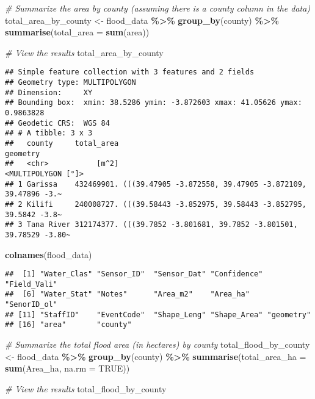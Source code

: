 \documentclass[
]{article}
\newenvironment{Shaded}{\begin{snugshade}}{\end{snugshade}}
\newcommand{\AttributeTok}[1]{\textcolor[rgb]{0.13,0.29,0.53}{#1}}
\newcommand{\CommentTok}[1]{\textcolor[rgb]{0.56,0.35,0.01}{\textit{#1}}}
\newcommand{\ConstantTok}[1]{\textcolor[rgb]{0.56,0.35,0.01}{#1}}
\newcommand{\FunctionTok}[1]{\textcolor[rgb]{0.13,0.29,0.53}{\textbf{#1}}}
\newcommand{\NormalTok}[1]{#1}
\newcommand{\OtherTok}[1]{\textcolor[rgb]{0.56,0.35,0.01}{#1}}
\newcommand{\SpecialCharTok}[1]{\textcolor[rgb]{0.81,0.36,0.00}{\textbf{#1}}}
\begin{document}
\begin{Shaded}
\begin{Highlighting}[]
\CommentTok{\# Summarize the area by county (assuming there is a county column in the data)}
\NormalTok{total\_area\_by\_county }\OtherTok{\textless{}{-}}\NormalTok{ flood\_data }\SpecialCharTok{\%\textgreater{}\%}
  \FunctionTok{group\_by}\NormalTok{(county) }\SpecialCharTok{\%\textgreater{}\%}
  \FunctionTok{summarise}\NormalTok{(}\AttributeTok{total\_area =} \FunctionTok{sum}\NormalTok{(area))}

\CommentTok{\# View the results}
\NormalTok{total\_area\_by\_county}
\end{Highlighting}
\end{Shaded}

\begin{verbatim}
## Simple feature collection with 3 features and 2 fields
## Geometry type: MULTIPOLYGON
## Dimension:     XY
## Bounding box:  xmin: 38.5286 ymin: -3.872603 xmax: 41.05626 ymax: 0.9863828
## Geodetic CRS:  WGS 84
## # A tibble: 3 x 3
##   county     total_area                                                 geometry
##   <chr>           [m^2]                                       <MULTIPOLYGON [°]>
## 1 Garissa    432469901. (((39.47905 -3.872558, 39.47905 -3.872109, 39.47896 -3.~
## 2 Kilifi     240008727. (((39.58443 -3.852975, 39.58443 -3.852795, 39.5842 -3.8~
## 3 Tana River 312174377. (((39.7852 -3.801681, 39.7852 -3.801501, 39.78529 -3.80~
\end{verbatim}

\begin{Shaded}
\begin{Highlighting}[]
\FunctionTok{colnames}\NormalTok{(flood\_data)}
\end{Highlighting}
\end{Shaded}

\begin{verbatim}
##  [1] "Water_Clas" "Sensor_ID"  "Sensor_Dat" "Confidence" "Field_Vali"
##  [6] "Water_Stat" "Notes"      "Area_m2"    "Area_ha"    "SenorID_ol"
## [11] "StaffID"    "EventCode"  "Shape_Leng" "Shape_Area" "geometry"  
## [16] "area"       "county"
\end{verbatim}

\begin{Shaded}
\begin{Highlighting}[]
    \CommentTok{\# Summarize the total flood area (in hectares) by county}
\NormalTok{total\_flood\_by\_county }\OtherTok{\textless{}{-}}\NormalTok{ flood\_data }\SpecialCharTok{\%\textgreater{}\%}
  \FunctionTok{group\_by}\NormalTok{(county) }\SpecialCharTok{\%\textgreater{}\%}
  \FunctionTok{summarise}\NormalTok{(}\AttributeTok{total\_area\_ha =} \FunctionTok{sum}\NormalTok{(Area\_ha, }\AttributeTok{na.rm =} \ConstantTok{TRUE}\NormalTok{))}

\CommentTok{\# View the results}
\NormalTok{total\_flood\_by\_county}
\end{Highlighting}
\end{Shaded}
\end{document}
